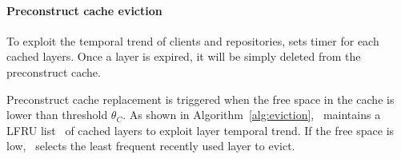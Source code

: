 \paragraph{Preconstruct cache eviction}
To exploit the temporal trend of clients and repositories, 
\sysname sets timer for each cached layers.
Once a layer is expired,
it will be simply deleted from the preconstruct cache.

Preconstruct cache replacement is triggered when the free space in the cache is
lower than threshold $\theta_{C}$.
As shown in Algorithm~\ref{alg:eviction}, 
\sysname~maintains a LFRU list~\cite{xxx} of cached layers to exploit 
layer temporal trend.
If the free space is low,
\sysname~selects the least frequent recently used layer to evict.




%





